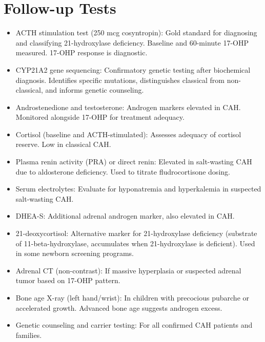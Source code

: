 \section*{Follow-up Tests}
\begin{itemize}
  \item ACTH stimulation test (250 mcg cosyntropin): Gold standard for diagnosing and classifying 21-hydroxylase deficiency. Baseline and 60-minute 17-OHP measured. 17-OHP response is diagnostic.
  \item CYP21A2 gene sequencing: Confirmatory genetic testing after biochemical diagnosis. Identifies specific mutations, distinguishes classical from non-classical, and informs genetic counseling.
  \item Androstenedione and testosterone: Androgen markers elevated in CAH. Monitored alongside 17-OHP for treatment adequacy.
  \item Cortisol (baseline and ACTH-stimulated): Assesses adequacy of cortisol reserve. Low in classical CAH.
  \item Plasma renin activity (PRA) or direct renin: Elevated in salt-wasting CAH due to aldosterone deficiency. Used to titrate fludrocortisone dosing.
  \item Serum electrolytes: Evaluate for hyponatremia and hyperkalemia in suspected salt-wasting CAH.
  \item DHEA-S: Additional adrenal androgen marker, also elevated in CAH.
  \item 21-deoxycortisol: Alternative marker for 21-hydroxylase deficiency (substrate of 11-beta-hydroxylase, accumulates when 21-hydroxylase is deficient). Used in some newborn screening programs.
  \item Adrenal CT (non-contrast): If massive hyperplasia or suspected adrenal tumor based on 17-OHP pattern.
  \item Bone age X-ray (left hand/wrist): In children with precocious pubarche or accelerated growth. Advanced bone age suggests androgen excess.
  \item Genetic counseling and carrier testing: For all confirmed CAH patients and families.
\end{itemize}

